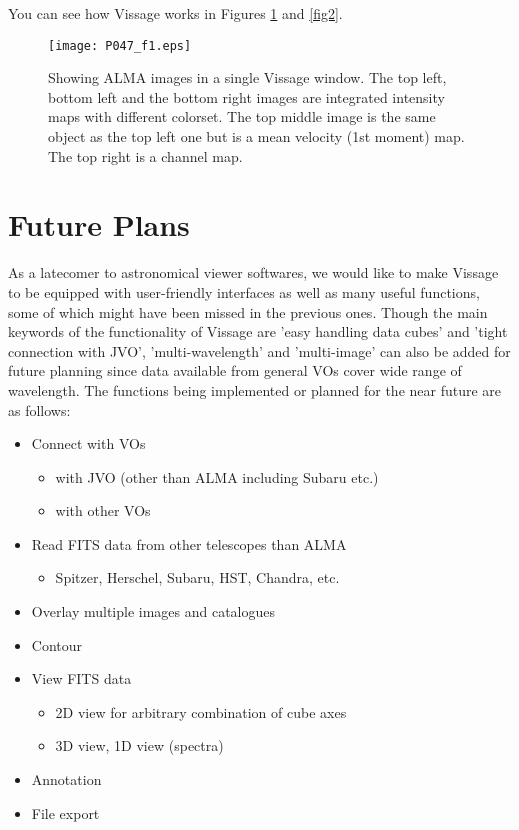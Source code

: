 \documentclass[11pt,twoside]{article}
\begin{document}
You can see how Vissage works in Figures \ref{fig1} and \ref{fig2}. 

\begin{figure}[tb]
  \centering
  \texttt{[image: P047\_f1.eps]}
  \caption{Showing ALMA images in a single Vissage window. The top left, bottom left and the bottom right images are integrated intensity maps with different colorset. The top middle image is the same object as the top left one but is a mean velocity (1st moment) map. The top right is a channel map.}
  \label{fig1}
\end{figure}

\section{Future Plans}
As a latecomer to astronomical viewer softwares, we would like to make Vissage 
to be equipped with user-friendly interfaces as well as many useful functions, 
some of which might have been missed in the previous ones. 
Though the main keywords of the functionality of Vissage are 'easy handling 
data cubes' and 'tight connection with JVO', 'multi-wavelength' and 
'multi-image' can also be added for future planning since data available from 
general VOs cover wide range of wavelength. 
The functions being implemented or planned for the near future are as follows: 

\begin{itemize}
  \item Connect with VOs
    \begin{itemize}
      \item with JVO (other than ALMA including Subaru etc.)
      \item with other VOs
    \end{itemize}
  \item Read FITS data from other telescopes than ALMA
    \begin{itemize}
      \item Spitzer, Herschel, Subaru, HST, Chandra, etc.
    \end{itemize}
  \item Overlay multiple images and catalogues
  \item Contour
  \item View FITS data
    \begin{itemize}
      \item 2D view for arbitrary combination of cube axes
      \item 3D view, 1D view (spectra)
    \end{itemize}
  \item Annotation
  \item File export
\end{itemize}
\end{document}
